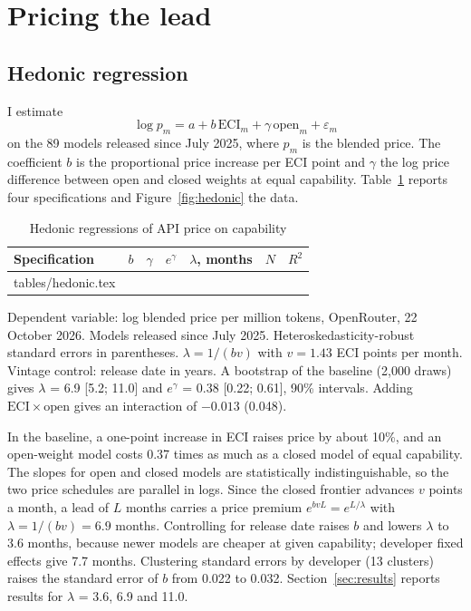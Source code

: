 \documentclass[12pt]{article}
\makeatletter
\newcommand{\ECI}{\mathrm{ECI}}
\newcommand{\tabinput}[1]{\@@input #1 }
\makeatother
\begin{document}
\section{Pricing the lead}\label{sec:price}

\subsection{Hedonic regression}

I estimate
\begin{equation}
\log p_m = a + b\,\ECI_m + \gamma\,\mathrm{open}_m + \varepsilon_m
\label{eq:hedonic}
\end{equation}
on the 89 models released since July 2025, where $p_m$ is the blended price. The coefficient $b$ is the proportional price increase per ECI point and $\gamma$ the log price difference between open and closed weights at equal capability. Table~\ref{tab:hedonic} reports four specifications and Figure~\ref{fig:hedonic} the data.

\begin{table}[t]
\centering
\begin{threeparttable}
\caption{Hedonic regressions of API price on capability}
\label{tab:hedonic}
\small
\begin{tabular}{lcccccc}
\toprule
Specification & $b$ & $\gamma$ & $e^{\gamma}$ & $\lambda$, months & $N$ & $R^2$ \\
\midrule
\tabinput{tables/hedonic.tex}
\bottomrule
\end{tabular}
\begin{tablenotes}\footnotesize
\item Dependent variable: log blended price per million tokens, OpenRouter, 22 October 2026. Models released since July 2025. Heteroskedasticity-robust standard errors in parentheses. $\lambda = 1/(b v)$ with $v = 1.43$ ECI points per month. Vintage control: release date in years. A bootstrap of the baseline (2,000 draws) gives $\lambda$ = 6.9 [5.2; 11.0] and $e^{\gamma}$ = 0.38 [0.22; 0.61], 90\% intervals. Adding $\ECI \times \mathrm{open}$ gives an interaction of $-0.013$ (0.048).
\end{tablenotes}
\end{threeparttable}
\end{table}

In the baseline, a one-point increase in ECI raises price by about 10\%, and an open-weight model costs 0.37 times as much as a closed model of equal capability. The slopes for open and closed models are statistically indistinguishable, so the two price schedules are parallel in logs. Since the closed frontier advances $v$ points a month, a lead of $L$ months carries a price premium $e^{bvL} = e^{L/\lambda}$ with $\lambda = 1/(bv) = 6.9$ months. Controlling for release date raises $b$ and lowers $\lambda$ to 3.6 months, because newer models are cheaper at given capability; developer fixed effects give 7.7 months. Clustering standard errors by developer (13 clusters) raises the standard error of $b$ from 0.022 to 0.032. Section~\ref{sec:results} reports results for $\lambda$ = 3.6, 6.9 and 11.0.
\end{document}
